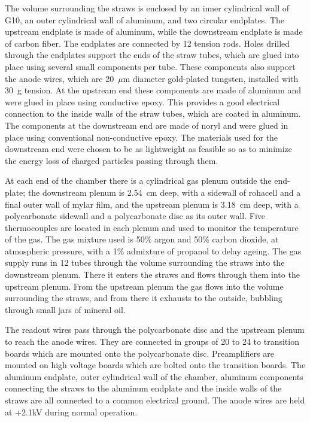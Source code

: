 The volume surrounding the straws is enclosed by an inner cylindrical wall of G10, an outer cylindrical wall of aluminum, and two circular endplates. 
The upstream endplate is made of aluminum, while the downstream endplate is made of carbon fiber. The endplates are connected by 12 tension rods. 
Holes drilled through the endplates support the ends of the straw tubes, which are glued into place using several small components per tube.  
These components also support the anode wires, which are 20~$\mu$m diameter gold-plated tungsten, installed with 30~g tension.
At the upstream end these components are made of aluminum and were glued in place using conductive epoxy. 
This provides a good electrical connection to the inside walls of the straw tubes, which are coated in aluminum.
The components at the downstream end are made of noryl and were glued in place using conventional non-conductive epoxy.
The materials used for the downstream end were chosen to be as lightweight as feasible so as to minimize the energy loss of charged particles passing through them. 

At each end of the chamber there is a cylindrical gas plenum outside the end-plate; the downstream plenum is 2.54~cm deep, with a sidewall of rohacell and a final outer wall of mylar film, and the upstream plenum is 3.18~cm deep, with a polycarbonate sidewall and a polycarbonate disc as its outer wall. 
Five thermocouples are located in each plenum and used to monitor the temperature of the gas.
The gas mixture used is 50$\%$ argon and 50$\%$ carbon dioxide, at atmospheric pressure, with a 1$\%$ admixture of propanol to delay ageing.
The gas supply runs in 12 tubes through the volume surrounding the straws into the downstream plenum. 
There it enters the straws and flows through them into the upstream plenum. From the upstream plenum the gas flows into the volume surrounding the straws, and from there it exhausts to the outside, bubbling through small jars of mineral oil.

The readout wires pass through the polycarbonate disc and the upstream plenum to reach the anode wires. 
They are connected in groups of 20 to 24 to transition boards which are mounted onto the polycarbonate disc. 
Preamplifiers\cite{hdnote923} are mounted on high voltage boards which are bolted onto the transition boards. The aluminum endplate, outer cylindrical wall of the chamber, aluminum components connecting the straws to the aluminum endplate and the inside walls of the straws are all connected to a common electrical ground. 
The anode wires are held at +2.1kV during normal operation. 

